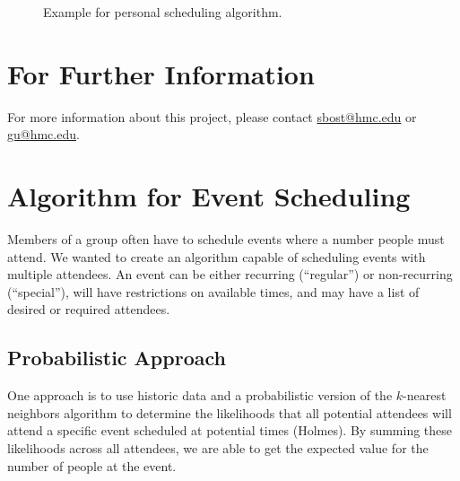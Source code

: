 \documentclass[thesis]{hmcposter}
\begin{document}
\begin{poster}
\begin{figure}
{        }\qquad\qquad
  \caption[Small multiples]{Example for personal scheduling algorithm.}%
  \label{fig:small-multiples}
\end{figure}



\section{For Further Information}
For more information about this project, please contact \url{sbost@hmc.edu} or \url{gu@hmc.edu}.


\section{Algorithm for Event Scheduling}
Members of a group often have to schedule events where a number people must attend.
We wanted to create an algorithm capable of scheduling events with multiple attendees.
An event can be either recurring (``regular'') or non-recurring (``special''), will have restrictions on available times, and may have a list of desired or required attendees.

\subsection{Probabilistic Approach}
One approach is to use historic data and a probabilistic version of the $k$-nearest neighbors algorithm to determine the likelihoods that all potential attendees will attend a specific event scheduled at potential times (Holmes).
By summing these likelihoods across all attendees, we are able to get the expected value for the number of people at the event.


\end{poster}
\end{document}
